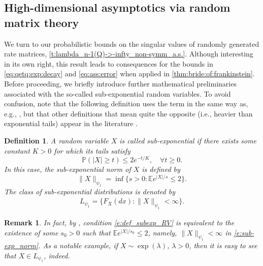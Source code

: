 \documentclass[9pt,twocolumn,twoside]{pnas-new}
\makeatletter
\newcommand{\bbP}{{\mathbb P}}
\newcommand{\bbE}{{\mathbb E}}
\newcommand{\?}{\textbf{?}}
\newtheorem{@definition}{\bf Definition}
\newenvironment{definition}{\begin{@definition}\rm}{\end{@definition}}
\newtheorem{@remark}{\bf Remark}
\newenvironment{remark}{\begin{@remark}\rm}{\end{@remark}}
\makeatother
\begin{document}
\subsection*{High-dimensional asymptotics
  via random matrix theory}

We turn to our probabilistic bounds on the singular values of randomly
generated rate matrices, \cref{t:lambda_n-1(Q)->-infty_non-symm_a.s.}.
Although interesting in its own right, this result leads to
consequences for the bounds in \eqref{eq:qetq:exp:decay} and
\eqref{eq:ass:error} when applied in \cref{thm:bride:of:frankinstein}.
Before proceeding, we briefly introduce further mathematical
preliminaries associated with the so-called sub-exponential random
variables.  To avoid confusion, note that the following definition uses the term in the same way as, e.g., \cite{vershynin:2018}, but that other definitions that mean quite the opposite (i.e., heavier than exponential tails) appear in the literature \cite{goldie1998subexponential}.
\begin{definition}
  \label{def:sub:exp:RV}
  A random variable $X$ is called \textit{sub-exponential} if there
  exists some constant $K > 0$ for which its tails satisfy
\begin{equation}\label{e:def_subexp_RV}
\bbP(|X|\geq t) \leq 2 e^{-t/K}, \quad \forall t \geq 0.
\end{equation}
In this case, the \textit{sub-exponential norm} of $X$ is defined by
\begin{equation}\label{e:sub-exp_norm}
\|X\|_{\psi_1} = \inf\big\{s > 0: \bbE e^{|X|/s} \leq 2\big\}.
\end{equation}
The \textit{class of sub-exponential distributions} is denoted by
\begin{align*}
L_{\psi_1} = \big\{F_X(dx): \|X\|_{\psi_1} < \infty \big\}.
\end{align*}
\end{definition}

\begin{remark}\label{rmk:exp:mom}
  In fact, by \cite[Proposition 2.7.1, p.\ 33]{vershynin:2018},
  condition \eqref{e:def_subexp_RV} is equivalent to the existence of
  some $s_0 > 0$ such that $\bbE e^{|X|/s_0} \leq 2$, namely,
  $\|X\|_{\psi_1} < \infty$ in \eqref{e:sub-exp_norm}.  As a notable
  example, if $X \sim \exp(\lambda)$, $\lambda > 0$, then it is easy
  to see that $X \in L_{\psi_1}$, indeed.
\end{remark}
\end{document}
